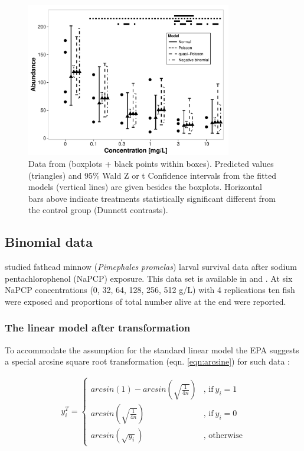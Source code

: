 \documentclass{scrartcl}
\begin{document}
\begin{figure}[h]
  \centering
  \includegraphics[width = 0.8\textwidth]{example.pdf}
  \caption{Data from \citet{brock_minimum_2015} (boxplots + black points within boxes). 
  Predicted values (triangles) and 95\% Wald Z or t Confidence intervals from the fitted models (vertical lines) are given besides the boxplots.
  Horizontal bars above indicate treatments statistically significant different from the control group (Dunnett contrasts).}
  \label{fig:example}
\end{figure}


\subsection{Binomial data}
\citet{weber_short-term_1989} studied fathead minnow (\textit{Pimephales promelas}) larval survival data after sodium pentachlorophenol (NaPCP) exposure.
This data set is available in \citet{newman_quantitative_2012} and \citet{epa_methods_2002}.
At six NaPCP concentrations (0, 32, 64, 128, 256, 512 \textmu g/L) with 4 replications ten fish were exposed and proportions of total number alive at the end were reported.

\subsubsection{The linear model after transformation}
To accommodate the assumption for the standard linear model the EPA suggests a special arcsine square root transformation (eqn. \ref{eqn:arcsine}) for such  data \citep{epa_methods_2002}:

\begin{align}
  y_i^T = 
  \begin{cases}  
    arcsin(1) - arcsin(\sqrt{\frac{1}{4n}}) & \text{, if}\ y_i = 1 \\
    arcsin(\sqrt{\frac{1}{4n}}) & \text{, if}\ y_i = 0  \\
    arcsin(\sqrt{y_i}) & \text{, otherwise}
  \end{cases} \label{eqn:arcsine}
\end{align}
\end{document}
